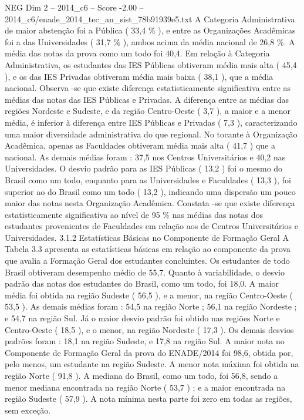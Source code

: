 \begin{textsample}{NEG Dim 2 – 2014\_c6 – Score -2.00 – 2014\_c6/enade\_2014\_tec\_an\_sist\_78b91939e5.txt}
A Categoria Administrativa de maior abstenção foi a Pública ( 33,4 \% ), e entre as Organizações Acadêmicas foi a das Universidades ( 31,7 \% ), ambos acima da média nacional de 26,8 \%.
A média das notas da prova como um todo foi 40,4.
Em relação à Categoria Administrativa, os estudantes das IES Públicas obtiveram média mais alta ( 45,4 ), e os das IES Privadas obtiveram média mais baixa ( 38,1 ), que a média nacional.
Observa -se que existe diferença estatisticamente significativa entre as médias das notas das IES Públicas e Privadas.
A diferença entre as médias das regiões Nordeste e Sudeste, e da região Centro-Oeste ( 3,7 ), a maior e a menor média, é inferior à diferença entre IES Públicas e Privadas ( 7,3 ), caracterizando uma maior diversidade administrativa do que regional.
No tocante à Organização Acadêmica, apenas as Faculdades obtiveram média mais alta ( 41,7 ) que a nacional.
As demais médias foram : 37,5 nos Centros Universitários e 40,2 nas Universidades.
O desvio padrão para as IES Públicas ( 13,2 ) foi o mesmo do Brasil como um todo, enquanto para as Universidades e Faculdades ( 13,3 ), foi superior ao do Brasil como um todo ( 13,2 ), indicando uma dispersão um pouco maior das notas nesta Organização Acadêmica.
Constata -se que existe diferença estatisticamente significativa ao nível de 95 \% nas médias das notas dos estudantes provenientes de Faculdades em relação aos de Centros Universitários e Universidades. 3.1.2 Estatísticas Básicas no Componente de Formação Geral A Tabela 3.3 apresenta as estatísticas básicas em relação ao componente da prova que avalia a Formação Geral dos estudantes concluintes.
Os estudantes de todo Brasil obtiveram desempenho médio de 55,7.
Quanto à variabilidade, o desvio padrão das notas dos estudantes do Brasil, como um todo, foi 18,0.
A maior média foi obtida na região Sudeste ( 56,5 ), e a menor, na região Centro-Oeste ( 53,5 ).
As demais médias foram : 54,5 na região Norte ; 56,1 na região Nordeste ; e 54,7 na região Sul.
Já o maior desvio padrão foi obtido nas regiões Norte e Centro-Oeste ( 18,5 ), e o menor, na região Nordeste ( 17,3 ).
Os demais desvios padrões foram : 18,1 na região Sudeste, e 17,8 na região Sul.
A maior nota no Componente de Formação Geral da prova do ENADE/2014 foi 98,6, obtida por, pelo menos, um estudante na região Sudeste.
A menor nota máxima foi obtida na região Norte ( 91,8 ).
A mediana do Brasil, como um todo, foi 56,8, sendo a menor mediana encontrada na região Norte ( 53,7 ) ; e a maior encontrada na região Sudeste ( 57,9 ).
A nota mínima nesta parte foi zero em todas as regiões, sem exceção.

\end{textsample}

